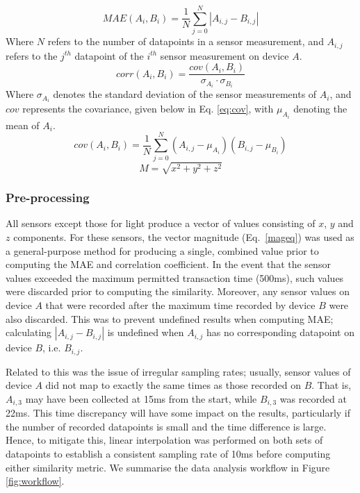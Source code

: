 \documentclass[runningheads,a4paper]{llncs}
\begin{document}
\begin{equation}
	MAE(A_{i}, B_{i}) = \frac{1}{N}\sum_{j=0}^{N} | A_{i,j} - B_{i,j} |
	\label{eq:mae}
\end{equation}
Where $N$ refers to the number of datapoints in a sensor measurement, and $A_{i,j}$ refers to the $j^{th}$ datapoint of the $i^{th}$ sensor measurement on device $A$.
\begin{equation}
	corr(A_{i}, B_{i}) = \frac{cov(A_{i}, B_{i})}{\sigma_{A_{i}} \cdot \sigma_{B_{i}}}
	\label{eq:corr}
\end{equation}
Where $\sigma_{A_{i}}$ denotes the standard deviation of the sensor measurements of $A_{i}$, and $cov$ represents the covariance, given below in Eq. \ref{eq:cov}, with $\mu_{A_{i}}$ denoting the mean of $A_{i}$.
\begin{equation}
	cov(A_{i}, B_{i}) = \frac{1}{N} \sum^{N}_{j=0}(A_{i,j} - \mu_{A_{i}})(B_{i,j} - \mu_{B_{i}})
	\label{eq:cov}
\end{equation}
\begin{equation}
	M = \sqrt{x^{2} + y^{2} + z^{2}}
	\label{mageq}
\end{equation}

\subsubsection{Pre-processing}

All sensors except those for light produce a vector of values consisting of $x$, $y$ and $z$ components.  For these sensors, the vector magnitude (Eq.\ \ref{mageq}) was used as a general-purpose method for producing a single, combined value prior to computing the MAE and correlation coefficient.  In the event that the sensor values exceeded the maximum permitted transaction time (500ms), such values were discarded prior to computing the similarity.  Moreover, any sensor values on device $A$ that were recorded after the maximum time recorded by device $B$ were also discarded.  This was to prevent undefined results when computing MAE; calculating $|A_{i,j} - B_{i,j}|$ is undefined when $A_{i,j}$ has no corresponding datapoint on device $B$, i.e. $B_{i,j}$.  

Related to this was the issue of irregular sampling rates; usually, sensor values of device $A$ did not map to exactly the same times as those recorded on $B$.  That is, $A_{i,3}$ may have been collected at 15ms from the start, while $B_{i,3}$ was recorded at 22ms.  This time discrepancy will have some impact on the results, particularly if the number of recorded datapoints is small and the time difference is large.  Hence, to mitigate this, linear interpolation was performed on both sets of datapoints to establish a consistent sampling rate of 10ms before computing either similarity metric.  We summarise the data analysis workflow in Figure \ref{fig:workflow}.
\end{document}
